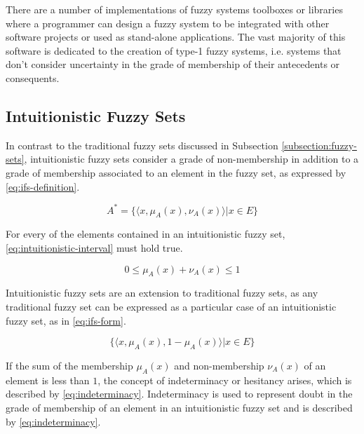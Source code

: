 There are a number of implementations of fuzzy systems toolboxes or libraries where a programmer can design a fuzzy system to be integrated with other software projects or used as stand-alone applications. The vast majority of this software is dedicated to the creation of type-1 fuzzy systems, i.e. systems that don't consider uncertainty in the grade of membership of their antecedents or consequents.

\subsection{Intuitionistic Fuzzy Sets}
\label{subsection:intuitionistic-fuzzy-sets}

In contrast to the traditional fuzzy sets discussed in Subsection \ref{subsection:fuzzy-sets}, intuitionistic fuzzy sets consider a grade of non-membership in addition to a grade of membership associated to an element in the fuzzy set, as expressed by \ref{eq:ifs-definition}.

\begin{equation}
  \label{eq:ifs-definition}
  A^{*} = \{\langle x, \mu _{A} (x), \nu _{A} (x) \rangle | x \in E\}
\end{equation}

For every of the elements contained in an intuitionistic fuzzy set, \ref{eq:intuitionistic-interval} must hold true.

\begin{equation}
  \label{eq:intuitionistic-interval}
  0 \leq \mu_{A}(x) + \nu_{A}(x) \leq 1
\end{equation}

Intuitionistic fuzzy sets are an extension to traditional fuzzy sets, as any traditional fuzzy set can be expressed as a particular case of an intuitionistic fuzzy set, as in \ref{eq:ifs-form}.

\begin{equation}
  \label{eq:ifs-form}
  \{ \langle x, \mu_{A}(x), 1 - \mu_{A}(x) \rangle | x \in E \}
\end{equation}

If the sum of the membership $\mu_{A}(x)$ and non-membership $\nu_{A}(x)$ of an element is less than $1$, the concept of indeterminacy or hesitancy arises, which is described by \ref{eq:indeterminacy}. Indeterminacy is used to represent doubt in the grade of membership of an element in an intuitionistic fuzzy set and is described by \ref{eq:indeterminacy}.

